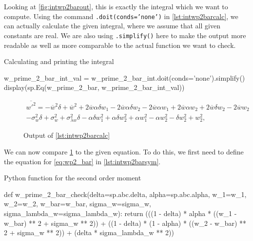 Looking at \cref{fig:intwp2barout},
this is exactly the integral which we want to compute.
Using the command \texttt{.doit(conds='none')} in \cref{lst:intwp2barcalc},
we can actually calculate the given integral,
where we assume that all given constants are real.
We are also using \texttt{.simplify()} here
to make the output more readable as well as more comparable to the actual function we want to check.
\begin{listing}[!ht]
    \caption{Calculating and printing the integral}
    \label{lst:intwp2barcalc}
    \begin{pythoncode}
        w_prime_2_bar_int_val = w_prime_2_bar_int.doit(conds='none').simplify()
        display(sp.Eq(w_prime_2_bar, w_prime_2_bar_int_val))
    \end{pythoncode}
\end{listing}
\begin{figure}[!ht]
    \centering
    \caption{Output of \cref{lst:intwp2barcalc}}
    \label{fig:intwp2barcalcout}
    \begin{align}
        \overline{w'^2}
        = - \overline{w}^{2} \delta + \overline{w}^{2} + 2 \overline{w} \alpha \delta w_{1} - 2 \overline{w} \alpha \delta w_{2} - 2 \overline{w} \alpha w_{1} + 2 \overline{w} \alpha w_{2} + 2 \overline{w} \delta w_{2} - 2 \overline{w} w_{2} \nonumber\\
        - \sigma_{w}^{2} \delta + \sigma_{w}^{2} + \sigma_{\lambda w}^{2} \delta - \alpha \delta w_{1}^{2} + \alpha \delta w_{2}^{2} + \alpha w_{1}^{2} - \alpha w_{2}^{2} - \delta w_{2}^{2} + w_{2}^{2} \nonumber,
    \end{align}
\end{figure}
We can now compare \cref{fig:intwp2barcalcout} to the given equation.
To do this, we first need to define the equation for \cref{eq:wp2_bar} in \cref{lst:intwp2barsym}.
\begin{listing}[!ht]
    \caption{Python function for the second order moment}
    \label{lst:intwp2barsym}
    \begin{pythoncode}
        def w_prime_2_bar_check(delta=sp.abc.delta, alpha=sp.abc.alpha, w_1=w_1, w_2=w_2,
        w_bar=w_bar, sigma_w=sigma_w, sigma_lambda_w=sigma_lambda_w):
            return (((1 - delta) * alpha * ((w_1 - w_bar) ** 2 + sigma_w ** 2)) 
                + ((1 - delta) * (1 - alpha) * ((w_2 - w_bar) ** 2 + sigma_w ** 2)) 
                + (delta * sigma_lambda_w ** 2))
    \end{pythoncode}
\end{listing}
